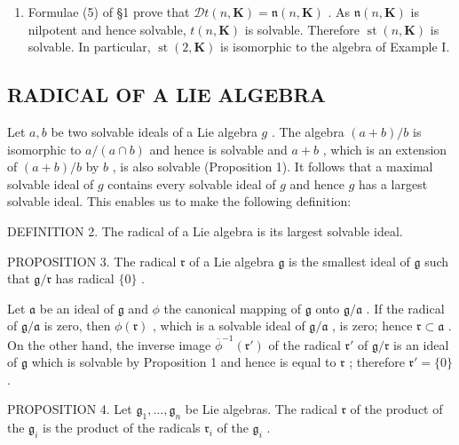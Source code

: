 \begin{enumerate}
\def\labelenumi{\Roman{enumi}.}
\setcounter{enumi}{1}
\tightlist
\item
  Formulae (5) of §1 prove that \(\mathcal{D}t(n, \mathbf{K}) = \mathfrak{n}(n, \mathbf{K})\) . As \(\mathfrak{n}(n, \mathbf{K})\) is nilpotent and hence solvable, \(t(n, \mathbf{K})\) is solvable. Therefore \(\operatorname{st}(n, \mathbf{K})\) is solvable. In particular, \(\operatorname{st}(2, \mathbf{K})\) is isomorphic to the algebra of Example I.
\end{enumerate}

\subsection{RADICAL OF A LIE ALGEBRA}

Let \(a, b\) be two solvable ideals of a Lie algebra \(g\) . The algebra \((a + b)/b\) is isomorphic to \(a/(a \cap b)\) and hence is solvable and \(a + b\) , which is an extension of \((a + b)/b\) by \(b\) , is also solvable (Proposition 1). It follows that a maximal solvable ideal of \(g\) contains every solvable ideal of \(g\) and hence \(g\) has a largest solvable ideal. This enables us to make the following definition:

DEFINITION 2. The radical of a Lie algebra is its largest solvable ideal.

PROPOSITION 3. The radical \(\mathfrak{r}\) of a Lie algebra \(\mathfrak{g}\) is the smallest ideal of \(\mathfrak{g}\) such that \(\mathfrak{g} / \mathfrak{r}\) has radical \(\{0\}\) .

Let \(\mathfrak{a}\) be an ideal of \(\mathfrak{g}\) and \(\phi\) the canonical mapping of \(\mathfrak{g}\) onto \(\mathfrak{g}/\mathfrak{a}\) . If the radical of \(\mathfrak{g}/\mathfrak{a}\) is zero, then \(\phi(\mathfrak{r})\) , which is a solvable ideal of \(\mathfrak{g}/\mathfrak{a}\) , is zero; hence \(\mathfrak{r} \subset \mathfrak{a}\) . On the other hand, the inverse image \(\overline{\phi}^{-1}(\mathfrak{r}')\) of the radical \(\mathfrak{r}'\) of \(\mathfrak{g}/\mathfrak{r}\) is an ideal of \(\mathfrak{g}\) which is solvable by Proposition 1 and hence is equal to \(\mathfrak{r}\) ; therefore \(\mathfrak{r}' = \{0\}\) .

PROPOSITION 4. Let \(\mathfrak{g}_1, \ldots, \mathfrak{g}_n\) be Lie algebras. The radical \(\mathfrak{r}\) of the product of the \(\mathfrak{g}_i\) is the product of the radicals \(\mathfrak{r}_i\) of the \(\mathfrak{g}_i\) .

